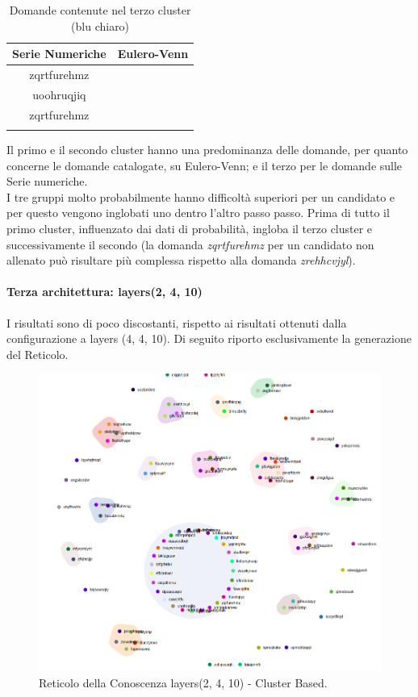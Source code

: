 \begin{longtable}{|c|c|}
	\hline
	\textbf{Serie Numeriche} & \textbf{Eulero-Venn} \\\hline\hline
	zqrtfurehmz &  \\
	uoohruqjiq  & \\
	zqrtfurehmz & \\
	
\hline
\caption{Domande contenute nel terzo cluster (blu chiaro)}\label{tab:Domande contenute nel terzo cluster}
\end{longtable}
\noindent
Il primo e il secondo cluster hanno una predominanza delle domande, per quanto concerne le domande catalogate, su Eulero-Venn; e il terzo per le domande sulle Serie numeriche.\\
I tre gruppi molto probabilmente hanno difficolt\`a superiori per un candidato e per questo vengono inglobati uno dentro l'altro passo passo.
Prima di tutto il primo cluster, influenzato dai dati di probabilit\`a, ingloba il terzo cluster e successivamente il secondo (la domanda \textit{zqrtfurehmz} per un candidato non allenato pu\`o risultare pi\`u complessa rispetto alla domanda \textit{zrehhcvjyl}).

\paragraph{Terza architettura: layers(2, 4, 10)}\mbox{}
\label{Terza architettura}
\noindent
I risultati sono di poco discostanti, rispetto ai risultati ottenuti dalla configurazione a layers (4, 4, 10). Di seguito riporto esclusivamente la generazione del Reticolo.

\begin{figure}[H]
\centering
	\includegraphics[width=0.70\linewidth]{./image/logica(2,4,10).png}
	\caption{Reticolo della Conoscenza layers(2, 4, 10) - Cluster Based.}
	\label{Reticolo della Conoscenza layers(2, 4, 10) - Cluster Based.}
\end{figure}
\noindent

